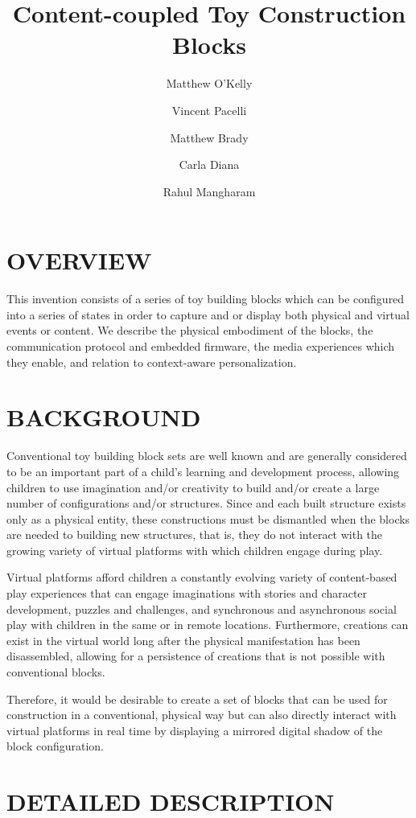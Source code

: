 \documentclass[]{article}
\title{Content-coupled Toy Construction Blocks}
\author{Matthew O'Kelly \and Vincent Pacelli \and Matthew Brady \and Carla Diana \and Rahul Mangharam}
\begin{document}
\maketitle

\section{OVERVIEW}
This invention consists of a series of toy building blocks which can be configured into a series of states in order to capture and or display both physical and virtual events or content. We describe the physical embodiment of the blocks, the communication protocol and embedded firmware, the media experiences which they enable, and relation to context-aware personalization. 

\section{BACKGROUND}
Conventional toy building block sets are well known and are generally considered to be an important part of a child's learning and development process, allowing children to use imagination and/or creativity to build and/or create a large number of configurations and/or structures. Since and each built structure exists only as a physical entity, these constructions must be dismantled when the blocks are needed to building new structures, that is, they do not interact with the growing variety of virtual platforms with which children engage during play.

Virtual platforms afford children a constantly evolving variety of content-based play experiences that can engage imaginations with stories and character development, puzzles and challenges, and synchronous and asynchronous social play with children in the same or in remote locations. Furthermore, creations can exist in the virtual world long after the physical manifestation has been disassembled, allowing for a persistence of creations that is not possible with conventional blocks.

Therefore, it would be desirable to create a set of blocks that can be used for construction in a conventional, physical way but can also directly interact with virtual platforms in real time by displaying a mirrored digital shadow of the block configuration.

\section{DETAILED DESCRIPTION}
\end{document}
